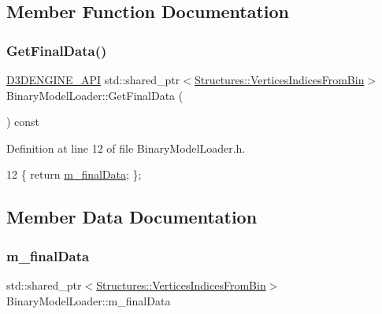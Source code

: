 \subsection{Member Function Documentation}
\mbox{\label{class_binary_model_loader_a8cc9581014e91f62f10e00c924fc8558}} 
\subsubsection{\texorpdfstring{Get\+Final\+Data()}{GetFinalData()}}
{\footnotesize\ttfamily \mbox{\hyperlink{stdafx_8h_a8ee2d990c5dfba7794dd2b60741d7722}{D3\+D\+E\+N\+G\+I\+N\+E\+\_\+\+A\+PI}} std\+::shared\+\_\+ptr$<$\mbox{\hyperlink{struct_structures_1_1_vertices_indices_from_bin}{Structures\+::\+Vertices\+Indices\+From\+Bin}}$>$ Binary\+Model\+Loader\+::\+Get\+Final\+Data (\begin{DoxyParamCaption}{ }\end{DoxyParamCaption}) const\hspace{0.3cm}{\ttfamily [inline]}}



Definition at line 12 of file Binary\+Model\+Loader.\+h.


\begin{DoxyCode}
12 \{ \textcolor{keywordflow}{return} \mbox{\hyperlink{class_binary_model_loader_ad91d8149dfde26ed2949bd05b854974a}{m\_finalData}}; \};
\end{DoxyCode}


\subsection{Member Data Documentation}
\mbox{\label{class_binary_model_loader_ad91d8149dfde26ed2949bd05b854974a}} 
\subsubsection{\texorpdfstring{m\+\_\+final\+Data}{m\_finalData}}
{\footnotesize\ttfamily std\+::shared\+\_\+ptr$<$\mbox{\hyperlink{struct_structures_1_1_vertices_indices_from_bin}{Structures\+::\+Vertices\+Indices\+From\+Bin}}$>$ Binary\+Model\+Loader\+::m\+\_\+final\+Data\hspace{0.3cm}{\ttfamily [private]}}



